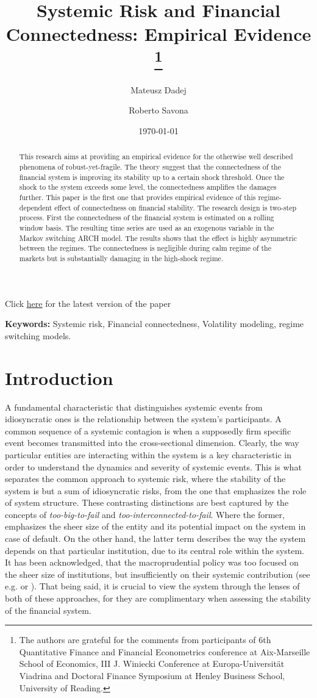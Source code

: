 \documentclass[12pt]{article}
\title{Systemic Risk and Financial Connectedness: Empirical Evidence \footnote{The authors are grateful for the comments from participants of 6th Quantitative Finance and Financial Econometrics conference at Aix-Marseille School of Economics, III J. Winiecki Conference at Europa-Universit{\"a}t Viadrina and Doctoral Finance Symposium at Henley Business School, University of Reading. } }
\author[1, $\dagger$]{Mateusz Dadej}
\author[1]{Roberto Savona}
\affil[1]{Univeristy of Brescia, Italy}
\affil[$\dagger$]{Corresponding author: m.dadej@unibs.it}
\date{\today}
\begin{document}
\maketitle
\centerline{\footnotesize Click \href{https://m-dadej.github.io/files/connectedness.pdf}{\underline{here}} for the latest version of the paper}

\begin{abstract}
This research aims at providing an empirical evidence for the otherwise well described phenomena of robust-yet-fragile. The theory suggest that the connectedness of the financial system is improving its stability up to a certain shock threshold. Once the shock to the system exceeds some level, the connectedness amplifies the damages further. This paper is the first one that provides empirical evidence of this regime-dependent effect of connectedness on financial stability. The research design is two-step process. First the connectedness of the financial system is estimated on a rolling window basis. The resulting time series are used as an exogenous variable in the Markov switching ARCH model. The results shows that the effect is highly asymmetric between the regimes. The connectedness is negligible during calm regime of the markets but is substantially damaging in the high-shock regime. 

\end{abstract}

\textbf{Keywords:} Systemic risk, Financial connectedness, Volatility modeling, regime switching models.

\newpage

\section{Introduction}

A fundamental characteristic that distinguishes systemic events from idiosyncratic ones is the relationship between the system's participants. A common sequence of a systemic contagion is when a supposedly firm specific event becomes transmitted into the cross-sectional dimension. Clearly, the way particular entities are interacting within the system is a key characteristic in order to understand the dynamics and severity of systemic events. This is what separates the common approach to systemic risk, where the stability of the system is but a sum of idiosyncratic risks, from the one that emphasizes the role of system structure. These contrasting distinctions are best captured by the concepts of \textit{too-big-to-fail} and \textit{too-interconnected-to-fail}. Where the former, emphasizes the sheer size of the entity and its potential impact on the system in case of default. On the other hand, the latter term describes the way the system depends on that particular institution, due to its central role within the system. It has been acknowledged, that the macroprudential policy was too focused on the sheer size of institutions, but insufficiently on their systemic contribution (see e.g. \cite{bernanke09} or \cite{rajan09}). That being said, it is crucial to view the system through the lenses of both of these approaches, for they are complimentary when assessing the stability of the financial system.
\end{document}
